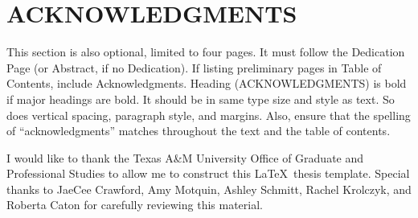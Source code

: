 %
%
%
%


\chapter*{ACKNOWLEDGMENTS}


\indent This section is also optional, limited to four pages. It must follow the Dedication Page (or Abstract, if no Dedication). If listing preliminary pages in Table of Contents, include Acknowledgments. Heading (\MakeUppercase{Acknowledgments}) is bold if major headings are bold. It should be in same type size and style as text. So does vertical spacing, paragraph style, and margins. Also, ensure that the spelling of ``acknowledgments'' matches throughout the text and the table of contents.

I would like to thank the Texas A\&M University Office of Graduate and Professional Studies to allow me to construct this \LaTeX\ thesis template. Special thanks to JaeCee Crawford, Amy Motquin, Ashley Schmitt, Rachel Krolczyk, and Roberta Caton for carefully reviewing this material.  %



\pagebreak{}